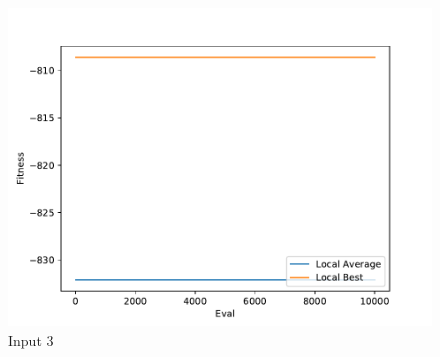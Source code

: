 \documentclass{standalone}
\begin{document}
\begin{figure}[!htb]
	\caption{Input 3}
	\label{fig:graph_3036}
	\includegraphics[width=\textwidth]{../graphs/graphs/3036.pdf}
\end{figure}
\end{document}
